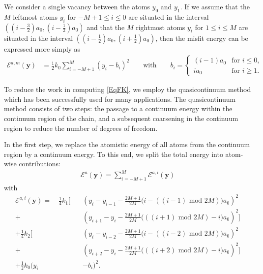 \documentclass[11pt,reqno,oneside]{amsart}
\numberwithin{equation}{section}
\begin{document}
We consider a single vacancy between the atoms $y_0$ and $y_1$. If we assume
that the $M$ leftmost atoms $y_i$ for $-M+1 \le i \le 0$ are situated in the
interval $\left( \left( i-\frac{3}{2} \right) a_0, \left( i-\frac{1}{2} \right)
  a_0 \right)$ and that the $M$ rightmost atoms $y_i$ for $1 \le i \le M$ are
situated in the interval $\left( \left( i-\frac{1}{2} \right) a_0, \left(
    i+\frac{1}{2} \right) a_0 \right)$, then the misfit energy can be
    expressed more simply as
\begin{align} \label{EqFKMisfit2}
{\mathcal{E}}^{a,m}({\mathbf{y}})
& = {{\textstyle \frac{1}{2}}} k_0 \sum_{i=-M+1}^M \left( y_i - b_i \right)^2
\qquad \text{with} \qquad
b_i = \begin{cases}
  (i-1)a_0 & \text{for } i \le 0, \\
  i    a_0 & \text{for } i \ge 1.
\end{cases}
\end{align}

To reduce the work
in computing \eqref{EqFK}, we employ the
quasicontinuum method \cite{TadmorMillerPhillipsOrtiz:1999,
  TadmorOrtizPhillips:1996, TadmorPhilipsOrtiz:1996} which has been successfully
used for many applications. The quasicontinuum method
consists of two steps: the passage to a continuum
energy within the continuum region of the chain, and a subsequent coarsening
in the continuum region to reduce the number of degrees of freedom.

In the first step, we replace the atomistic energy of all atoms from the
continuum region by a continuum energy. To this end, we split the total energy
into atom-wise contributions:
\begin{align}
{\mathcal{E}}^a({\mathbf{y}}) = \sum_{i=-M+1}^M {\mathcal{E}}^{a,i}({\mathbf{y}})
\end{align}
with
\begin{equation}
\begin{split}
{\mathcal{E}}^{a,i}({\mathbf{y}}) = \quad {{\textstyle \frac{1}{4}}} k_1 \Big[ \quad
  & \left( y_i - y_{i-1} - {\textstyle \frac{2M+1}{2M}} \big(i-\left(\left(i-1\right) \text{ mod } 2M\right)\big) a_0 \right)^2
    \\
+ & \left( y_{i+1} - y_i - {\textstyle \frac{2M+1}{2M}} \big(\left(\left(i+1\right) \text{ mod } 2M\right)-i\big) a_0 \right)^2 \Big] \\
+ {{\textstyle \frac{1}{4}}} k_2 \Big[ \quad
  & \left( y_i - y_{i-2} - {\textstyle \frac{2M+1}{2M}} \big(i-\left(\left(i-2\right) \text{ mod } 2M\right)\big) a_0 \right)^2
    \\
+ & \left( y_{i+2} - y_i - {\textstyle \frac{2M+1}{2M}} \big(\left(\left(i+2\right) \text{ mod } 2M\right)-i\big) a_0 \right)^2 \Big] \\
+ {{\textstyle \frac{1}{2}}} k_0 ( y_i & - b_i )^2.
\end{split}
\end{equation}
\end{document}
